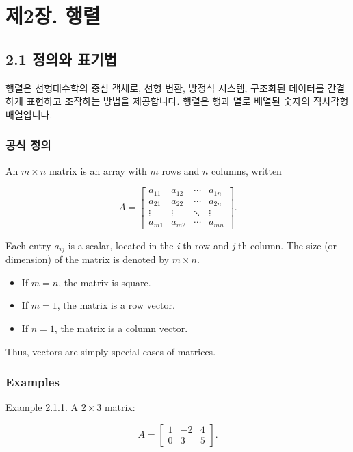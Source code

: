 \documentclass[
  12pt,
  a4paper,
]{article}
\let\oldsection\section
\renewcommand{\section}{\clearpage\oldsection}
\begin{document}
\section{제2장. 행렬}\label{chapter-2-matrices}

\subsection{2.1 정의와
표기법}\label{21-definition-and-notation}

행렬은 선형대수학의 중심 객체로, 선형 변환, 방정식 시스템, 구조화된 데이터를 간결하게 표현하고 조작하는 방법을 제공합니다. 행렬은 행과 열로 배열된 숫자의 직사각형 배열입니다.

\subsubsection{공식 정의}\label{formal-definition}

An \(m \times n\) matrix is an array with \(m\) rows and \(n\) columns,
written

\[A =
\begin{bmatrix}
a_{11} & a_{12} & \cdots & a_{1n} \\
a_{21} & a_{22} & \cdots & a_{2n} \\
\vdots & \vdots & \ddots & \vdots \\
a_{m1} & a_{m2} & \cdots & a_{mn}
\end{bmatrix}.\]

Each entry \(a_{ij}\) is a scalar, located in the \emph{i}-th row and
\emph{j}-th column. The size (or dimension) of the matrix is denoted by
\(m \times n\).

\begin{itemize}
\item
  If \(m = n\), the matrix is square.
\item
  If \(m = 1\), the matrix is a row vector.
\item
  If \(n = 1\), the matrix is a column vector.
\end{itemize}

Thus, vectors are simply special cases of matrices.

\subsubsection{Examples}\label{examples}

Example 2.1.1. A \(2 \times 3\) matrix:

\[A = \begin{bmatrix}
1 & -2 & 4 \\
0 & 3 & 5
\end{bmatrix}.\]
\end{document}
